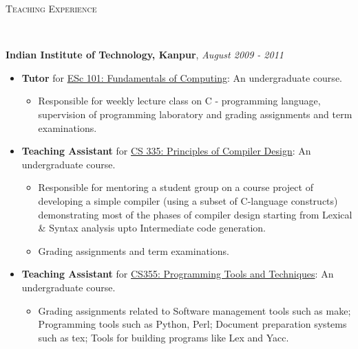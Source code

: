 \documentclass[9pt]{article}
\newenvironment{changemargin}[2]{%
  \begin{list}{}{%
    \setlength{\topsep}{0pt}%
    \setlength{\leftmargin}{#1}%
    \setlength{\rightmargin}{#2}%
    \setlength{\listparindent}{\parindent}%
    \setlength{\itemindent}{\parindent}%
    \setlength{\parsep}{\parskip}%
  }%
  \item[]}{\end{list}
}
\newcommand{\lineover}{
	\begin{changemargin}{-0.05in}{-0.05in}
		\vspace*{-8pt}
		\hrulefill \\
		\vspace*{-2pt}
	\end{changemargin}
}
\newcommand{\header}[1]{
	\begin{changemargin}{-0.5in}{-0.5in}
		\scshape{#1}\\
  	\lineover
	\end{changemargin}
}
\newenvironment{body} {
	\vspace*{-16pt}
	\begin{changemargin}{-0.25in}{-0.5in}
  }	
	{\end{changemargin}
}
\begin{document}
\header{Teaching Experience}

\begin{body}
	\vspace{14pt}
	\textbf{Indian Institute of Technology, Kanpur},  \hfill \emph{August 2009 - 2011}\\
	\vspace*{-4pt}
	\begin{itemize} \itemsep -0pt  %
		\item \textbf{Tutor} for \href{http://www.cse.iitk.ac.in/teaching/courses/ESc101.html}{ESc 101: Fundamentals of Computing}: An undergraduate course.
			\begin{itemize}
				\item Responsible for weekly lecture class on C - programming language, supervision of programming laboratory and grading assignments and term examinations.
			\end{itemize}
		\item \textbf{Teaching Assistant} for \href{http://www.cse.iitk.ac.in/teaching/courses/CS335.html}{CS 335: Principles of Compiler Design}: An undergraduate course.
			\begin{itemize}
				\item Responsible for mentoring a student group on a course project of developing a simple compiler (using a subset of C-language constructs) demonstrating most of the phases of compiler design starting from Lexical \& Syntax analysis upto Intermediate code generation.
				\item Grading assignments and term examinations.
			\end{itemize}
		\item \textbf{Teaching Assistant} for \href{http://www.cse.iitk.ac.in/teaching/courses/CS355.html}{CS355: Programming Tools and Techniques}: An undergraduate course.
			\begin{itemize}
				\item Grading assignments related to Software management tools such as make; Programming tools such as Python, Perl; Document preparation systems such as tex; Tools for building programs like Lex and Yacc.
			\end{itemize}
	\end{itemize}
\end{body}

\smallskip

\end{document}
